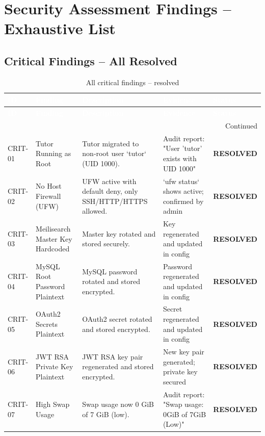 \section{Security Assessment Findings – Exhaustive List}

\subsection{Critical Findings – All Resolved}
\begin{center}
\begin{longtable}{|p{}|p{}|p{}|p{}|p{}|}
\caption[Critical Findings]{All critical findings – resolved}
\label{tab:critical-findings} \\
\hline
\rowcolor{mooveblue}
\textcolor{white}{\textbf{ID}} & \textcolor{white}{\textbf{Finding}} & \textcolor{white}{\textbf{Description}} & \textcolor{white}{\textbf{Evidence}} & \textcolor{white}{\textbf{Status}} \\
\hline
\endfirsthead
\hline
\rowcolor{mooveblue}
\textcolor{white}{\textbf{ID}} & \textcolor{white}{\textbf{Finding}} & \textcolor{white}{\textbf{Description}} & \textcolor{white}{\textbf{Evidence}} & \textcolor{white}{\textbf{Status}} \\
\hline
\endhead
\hline
\multicolumn{5}{|r|}{Continued} \\
\hline
\endfoot
\hline
\endlastfoot
CRIT-01 & Tutor Running as Root & Tutor migrated to non‑root user `tutor` (UID 1000). & Audit report: "User 'tutor' exists with UID 1000" & \textbf{RESOLVED} \\
CRIT-02 & No Host Firewall (UFW) & UFW active with default deny, only SSH/HTTP/HTTPS allowed. & `ufw status` shows active; confirmed by admin & \textbf{RESOLVED} \\
CRIT-03 & Meilisearch Master Key Hardcoded & Master key rotated and stored securely. & Key regenerated and updated in config & \textbf{RESOLVED} \\
CRIT-04 & MySQL Root Password Plaintext & MySQL password rotated and stored encrypted. & Password regenerated and updated in config & \textbf{RESOLVED} \\
CRIT-05 & OAuth2 Secrets Plaintext & OAuth2 secret rotated and stored encrypted. & Secret regenerated and updated in config & \textbf{RESOLVED} \\
CRIT-06 & JWT RSA Private Key Plaintext & JWT RSA key pair regenerated and stored encrypted. & New key pair generated; private key secured & \textbf{RESOLVED} \\
CRIT-07 & High Swap Usage & Swap usage now 0 GiB of 7 GiB (low). & Audit report: "Swap usage: 0GiB of 7GiB (Low)" & \textbf{RESOLVED} \\
\hline
\end{longtable}
\end{center}

